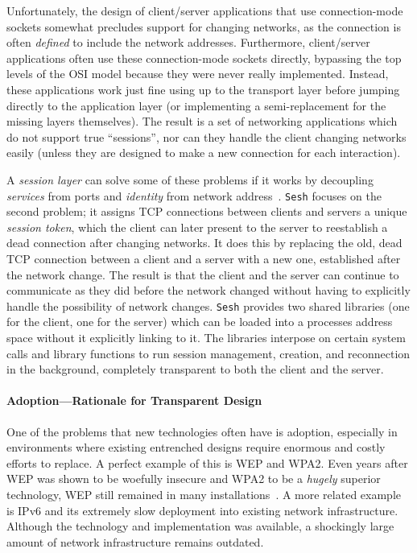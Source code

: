 \documentclass[twocolumn,10pt]{article}
\newcommand{\Sesh}{\texttt{Sesh}\xspace}
\begin{document}
Unfortunately, the design of client/server applications that use connection-mode
sockets somewhat precludes support for changing networks, as the connection is
often \textit{defined} to include the network addresses. Furthermore,
client/server applications often use these connection-mode sockets directly,
bypassing the top levels of the OSI model because they were never really
implemented. Instead, these applications work just fine using up to the
transport layer before jumping directly to the application layer (or
implementing a semi-replacement for the missing layers themselves). The result
is a set of networking applications which do not support true ``sessions'', nor
can they handle the client changing networks easily (unless they are designed to
make a new connection for each interaction).

A \textit{session layer} can solve some of these problems if it works by
decoupling \textit{services} from ports and \textit{identity} from network
address~\cite{wasptr-15-01,chandrashekar2003service}.
\Sesh focuses on the second problem; it assigns TCP connections between
clients and servers a unique \textit{session token}, which the client can later
present to the server to reestablish a dead connection after changing networks.
It does this by replacing the old, dead TCP connection between a client and a
server with a new one, established after the network change. The result is that
the client and the server can continue to communicate as they did before the
network changed without having to explicitly handle the possibility of network
changes. \Sesh provides two shared libraries (one for the client, one for the
server) which can be loaded into a processes address space without it
explicitly linking to it. The libraries interpose on certain system calls and
library functions to run session management, creation, and reconnection in the
background, completely transparent to both the client and the server.

\paragraph{Adoption---Rationale for Transparent Design}
One of the problems that new technologies often have is adoption, especially in environments
where existing entrenched designs require enormous and costly efforts to
replace. A perfect example of this is WEP and WPA2. Even years after WEP was
shown to be woefully insecure and WPA2 to be a \textit{hugely} superior
technology, WEP still remained in many installations~\cite{bittau2006sp}. A more
related example is IPv6 and its extremely slow deployment into existing network
infrastructure. Although the technology and implementation was available, a
shockingly large amount of network infrastructure remains outdated.
\end{document}
